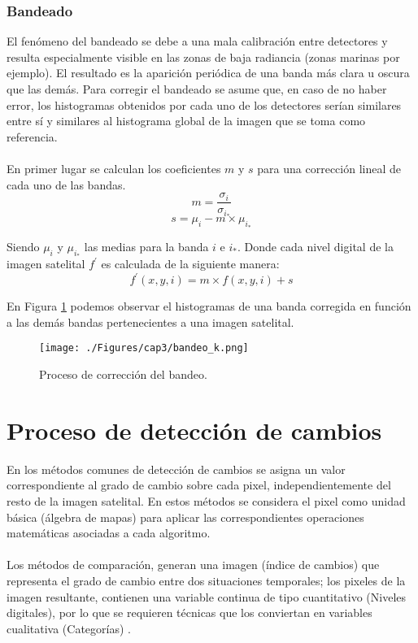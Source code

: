 \subsubsection{Bandeado}\label{subsec:bandeado}
El fen\'omeno del bandeado se debe a una mala calibraci\'on entre detectores y resulta especialmente visible en las zonas de baja radiancia (zonas marinas por ejemplo). El resultado es la aparici\'on peri\'odica de una banda m\'as clara u oscura que las dem\'as.
Para corregir el bandeado se asume que, en caso de no haber error, los histogramas obtenidos por cada uno de los detectores ser\'ian similares entre s\'i y similares al histograma global de la imagen que se toma como referencia.\\~\\
En primer lugar se calculan los coeficientes $ m $ y $ s $ para una correcci\'on lineal de cada uno de las bandas.
		\begin{equation}
		m =\dfrac{\sigma_{i}}{\sigma_{i_{*}}}
		\end{equation} 	
				\begin{equation}
				s=\mu_{i} - m \times \mu_{i_{*}}
				\end{equation} 	
				
Siendo $ \mu_{i} $ y $ \mu_{i_{*}} $ las medias para la banda $ i $ e $ i_{*} $. Donde cada nivel digital de la imagen satelital $ f^{'} $ es calculada de la siguiente manera:
				\begin{equation}
				f^{'}(x,y,i) = m \times f(x,y,i) + s
				\end{equation} 				

En Figura \ref{fig:bandeado} podemos observar el histogramas de una banda corregida en funci\'on a las dem\'as bandas pertenecientes a una imagen satelital. 
    \begin{figure}[H]
    	\centering
    	\texttt{[image: ./Figures/cap3/bandeo\_k.png]}
    	\caption{Proceso de correcci\'on del bandeo.}
    	\label{fig:bandeado}
    \end{figure}

\section{Proceso de detecci\'on de cambios}
	En los m\'etodos comunes de detecci\'on de cambios se asigna un valor correspondiente al grado de cambio sobre cada pixel, independientemente del resto de la imagen satelital. En estos m\'etodos se considera el pixel como unidad b\'asica (\'algebra de mapas) para aplicar las correspondientes operaciones matem\'aticas asociadas a cada algoritmo.\\~\\
Los m\'etodos de comparaci\'on, generan una imagen (\'indice de cambios) que representa el grado de cambio entre dos situaciones temporales; los pixeles de la imagen resultante, contienen una variable continua de tipo cuantitativo (Niveles digitales), por lo que se requieren t\'ecnicas que los conviertan en variables cualitativa (Categor\'ias) \cite{martinez2013normalizacion}.

